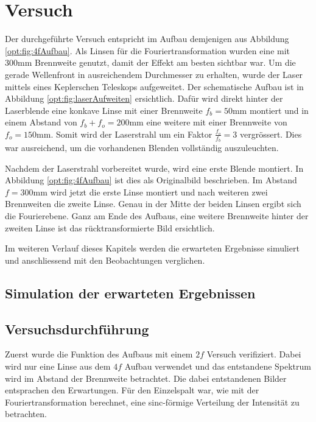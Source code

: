 %
%
%
%
\section{Versuch
  \label{opt:section:versuch}}

Der durchgeführte Versuch entspricht im Aufbau demjenigen aus Abbildung \ref{opt:fig:4fAufbau}.
Als Linsen für die Fouriertransformation wurden eine mit 300mm Brennweite genutzt, damit der Effekt am besten sichtbar war.
Um die gerade Wellenfront in ausreichendem Durchmesser zu erhalten, wurde der Laser mittels eines Keplerschen Teleskops aufgeweitet.
Der schematische Aufbau ist in Abbildung \ref{opt:fig:laserAufweiten} ersichtlich.
Dafür wird direkt hinter der Laserblende eine konkave Linse mit einer Brennweite $f_b = 50\text{mm}$ montiert 
und in einem Abstand von $f_b + f_o = 200\text{mm}$ eine weitere mit einer Brennweite von $f_o = 150\text{mm}$.
Somit wird der Laserstrahl um ein Faktor $\frac{f_o}{f_b} = 3$ vergrössert.
Dies war ausreichend, um die vorhandenen Blenden vollständig auszuleuchten.

Nachdem der Laserstrahl vorbereitet wurde, wird eine erste Blende montiert.
In Abbildung \ref{opt:fig:4fAufbau} ist dies als Originalbild beschrieben.
Im Abstand $f=300\text{mm}$ wird jetzt die erste Linse montiert und nach weiteren zwei Brennweiten die zweite Linse.
Genau in der Mitte der beiden Linsen ergibt sich die Fourierebene.
Ganz am Ende des Aufbaus, eine weitere Brennweite hinter der zweiten Linse ist das rücktransformierte Bild ersichtlich.

Im weiteren Verlauf dieses Kapitels werden die erwarteten Ergebnisse simuliert und anschliessend mit den Beobachtungen verglichen.

\subsection{Simulation der erwarteten Ergebnissen}

\subsection{Versuchsdurchführung}
Zuerst wurde die Funktion des Aufbaus mit einem $2f$ Versuch verifiziert.
Dabei wird nur eine Linse aus dem $4f$ Aufbau verwendet und das entstandene Spektrum wird im Abstand der Brennweite betrachtet.
Die dabei entstandenen Bilder entsprachen den Erwartungen.
Für den Einzelspalt war, wie mit der Fouriertransformation berechnet, eine sinc-förmige Verteilung der Intensität zu betrachten.

